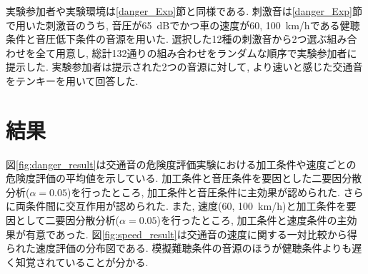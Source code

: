 \documentclass[10pt,twocolumn,uplatex,dvipdfmx]{jsarticle} %
\begin{document}
実験参加者や実験環境は\ref{danger_Exp}節と同様である. 刺激音は\ref{danger_Exp}節で用いた刺激音のうち, 音圧が65~dBでかつ車の速度が60, 100~km/hである健聴条件と音圧低下条件の音源を用いた. 選択した12種の刺激音から2つ選ぶ組み合わせを全て用意し, 総計132通りの組み合わせをランダムな順序で実験参加者に提示した. 実験参加者は提示された2つの音源に対して, より速いと感じた交通音をテンキーを用いて回答した.

\section{結果}

図\ref{fig:danger_result}は交通音の危険度評価実験における加工条件や速度ごとの危険度評価の平均値を示している. 加工条件と音圧条件を要因とした二要因分散分析($\alpha=0.05$)を行ったところ, 加工条件と音圧条件に主効果が認められた. さらに両条件間に交互作用が認められた. また, 速度(60, 100~km/h)と加工条件を要因として二要因分散分析($\alpha=0.05$)を行ったところ, 加工条件と速度条件の主効果が有意であった.
図\ref{fig:speed_result}は交通音の速度に関する一対比較から得られた速度評価の分布図である. 模擬難聴条件の音源のほうが健聴条件よりも遅く知覚されていることが分かる.

\end{document}
